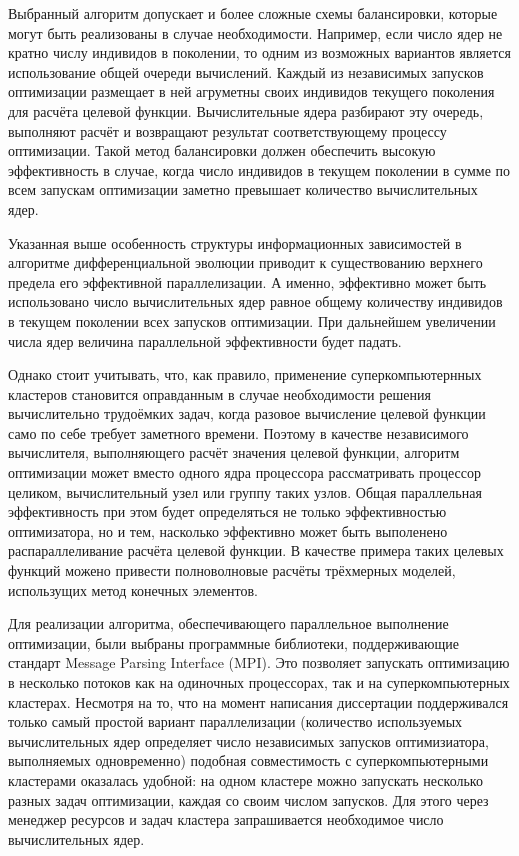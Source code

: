 Выбранный алгоритм допускает и более сложные схемы балансировки,
которые могут быть реализованы в случае необходимости. Например, если
число ядер не кратно числу индивидов в поколении, то одним из
возможных вариантов является использование общей очереди
вычислений. Каждый из независимых запусков оптимизации размещает в ней
агруметны своих индивидов текущего поколения для расчёта целевой
функции.  Вычислительные ядера разбирают эту очередь, выполняют расчёт
и возвращают результат соответствующему процессу оптимизации. Такой
метод балансировки должен обеспечить высокую эффективность в случае,
когда число индивидов в текущем поколении в сумме по всем запускам
оптимизации заметно превышает количество вычислительных ядер.

Указанная выше особенность структуры информационных зависимостей в
алгоритме дифференциальной эволюции приводит к существованию верхнего
предела его эффективной параллелизации.  А именно, эффективно может быть
использовано число вычислительных ядер равное общему количеству
индивидов в текущем поколении всех запусков оптимизации. При
дальнейшем увеличении числа ядер величина параллельной эффективности
будет падать.  

Однако стоит учитывать, что, как правило, применение
суперкомпьютернных кластеров становится оправданным в случае
необходимости решения вычислительно трудоёмких задач, когда разовое
вычисление целевой функции само по себе требует заметного
времени. Поэтому в качестве независимого вычислителя, выполняющего
расчёт значения целевой функции, алгоритм оптимизации может вместо
одного ядра процессора рассматривать процессор целиком, вычислительный
узел или группу таких узлов. Общая параллельная эффективность при этом
будет определяться не только эффективностью оптимизатора, но и тем,
насколько эффективно может быть выполенено распараллеливание расчёта
целевой функции.  В качестве примера таких целевых функций можено
привести полноволновые расчёты трёхмерных моделей, использущих метод
конечных элементов.

Для реализации алгоритма, обеспечивающего параллельное выполнение
оптимизации, были выбраны программные библиотеки, поддерживающие
стандарт Message Parsing Interface (MPI). Это позволяет запускать
оптимизацию в несколько потоков как на одиночных процессорах, так и на
суперкомпьютерных кластерах. Несмотря на то, что на момент написания
диссертации поддерживался только самый простой вариант параллелизации
(количество используемых вычислительных ядер определяет число
независимых запусков оптимизиатора, выполняемых одновременно) подобная
совместимость с суперкомпьютерными кластерами оказалась удобной: на
одном кластере можно запускать несколько разных задач оптимизации,
каждая со своим числом запусков. Для этого через менеджер ресурсов и
задач кластера запрашивается необходимое число вычислительных ядер.

